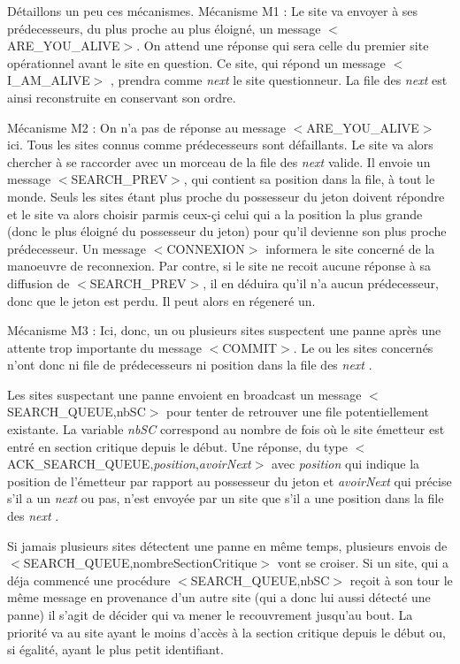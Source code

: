 \documentclass[a4paper,12pt]{report}
\newcommand{\next}{\textit{next} }
\begin{document}
Détaillons un peu ces mécanismes.
Mécanisme M1 : Le site va envoyer à ses prédecesseurs, du plus proche au plus éloigné, un message $<$ARE\_YOU\_ALIVE$>$. On attend une réponse qui sera celle du premier site opérationnel avant le site en question. Ce site, qui répond un message $<$I\_AM\_ALIVE$>$ , prendra comme \next le site 
questionneur. La file des \next est ainsi reconstruite en conservant son ordre.

Mécanisme M2 : On n'a pas de réponse au message $<$ARE\_YOU\_ALIVE$>$ ici. Tous les sites connus comme prédecesseurs sont défaillants. Le site va alors chercher à se raccorder avec un morceau de la file des \next valide. Il envoie un message $<$SEARCH\_PREV$>$, qui contient sa position dans la file, à tout le monde.
Seuls les sites étant plus proche du possesseur du jeton doivent répondre et le site va alors choisir parmis ceux-çi celui qui a la position la plus grande (donc le plus éloigné du possesseur du jeton) pour qu'il devienne son plus proche prédecesseur. Un message $<$CONNEXION$>$ informera le site concerné de la manoeuvre de reconnexion.
Par contre, si le site ne recoit aucune réponse à sa diffusion de $<$SEARCH\_PREV$>$, il en déduira qu'il n'a aucun prédecesseur, donc que le jeton est perdu. Il peut alors en régeneré un.

Mécanisme M3 : Ici, donc, un ou plusieurs sites suspectent une panne après une attente trop importante du message $<$COMMIT$>$. Le ou les sites concernés n'ont donc ni file de prédecesseurs ni position dans la file des \next. 

Les sites suspectant une panne envoient en broadcast un message $<$SEARCH\_QUEUE,nbSC$>$ pour tenter de retrouver une file potentiellement existante. La variable \textit{nbSC} correspond au nombre de fois où le site émetteur est entré en section critique depuis le début. Une réponse, du type $<$ACK\_SEARCH\_QUEUE,\textit{position},\textit{avoirNext}$>$ avec \textit{position} qui indique la position de l'émetteur par rapport au possesseur du jeton et \textit{avoirNext} qui précise s'il a un \next ou pas, n'est envoyée par un site que s'il a une position dans la file des \next. 

Si jamais plusieurs sites détectent une panne en même temps, plusieurs envois de $<$SEARCH\_QUEUE,nombreSectionCritique$>$ vont se croiser. Si un site, qui a déja commencé une procédure $<$SEARCH\_QUEUE,nbSC$>$ reçoit à son tour le même message en provenance d'un autre site (qui a donc lui aussi détecté une panne) il s'agit de décider qui va mener le recouvrement jusqu'au bout. La priorité va au site ayant le moins d'accès à la section critique depuis le début ou, si égalité, ayant le plus petit identifiant.
\end{document}
